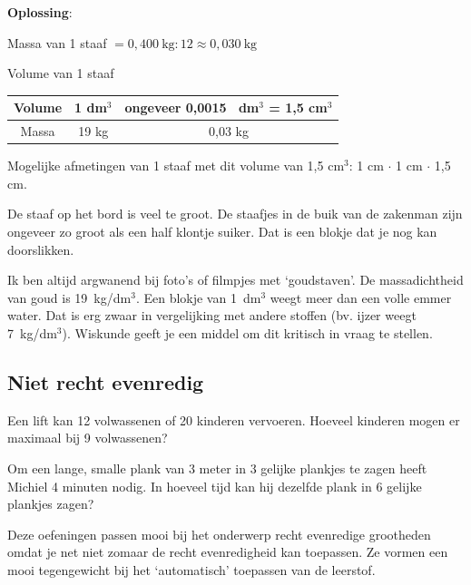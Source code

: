 \textbf{Oplossing}:
\begin{nummering}
  \item Massa van 1 staaf $= 0,400~\textrm{kg} : 12 \approx 0,030~ \textrm{kg} $
  \item Volume van 1 staaf
   \begin{flushleft}
   \begin{tabular}{ | c | c | c| }
     \hline
     Volume & 1 dm$^3$ & ongeveer 0,0015~ dm$^3$ = 1,5 cm$^3$ \\
     \hline
     Massa  & 19 kg  & 0,03 kg  \\
     \hline
  \end{tabular}
  \end{flushleft}
\item Mogelijke afmetingen van 1 staaf met dit volume van 1,5 cm$^3$: 1 cm $\cdot$ 1 cm $\cdot$ 1,5 cm.
\end{nummering}
De staaf op het bord is veel te groot. De staafjes in de buik van de zakenman zijn ongeveer zo groot als een half klontje suiker. Dat is een blokje dat je nog kan doorslikken.


Ik ben altijd argwanend bij foto's of filmpjes met `goudstaven'. De massadichtheid van goud is 19~kg/dm$^3$. Een blokje van 1~dm$^3$ weegt meer dan  een volle emmer water. Dat is erg zwaar in vergelijking met andere stoffen (bv. ijzer weegt 7~kg/dm$^3$). Wiskunde geeft je een middel om dit kritisch in vraag te stellen.


\subsection{Niet recht evenredig}

\begin{werktekstoef}

\item{Een lift kan 12 volwassenen of 20 kinderen vervoeren. Hoeveel kinderen mogen er maximaal bij 9 volwassenen?}
\item{Om een lange, smalle plank van 3 meter in 3 gelijke plankjes te zagen heeft Michiel 4 minuten nodig. In hoeveel tijd kan hij dezelfde plank in 6 gelijke plankjes zagen?}

\end{werktekstoef}  
\eindewerktekst

Deze oefeningen passen mooi bij het onderwerp recht evenredige grootheden omdat je net niet zomaar de recht evenredigheid kan toepassen. Ze vormen een mooi tegengewicht bij het `automatisch' toepassen van de leerstof.

